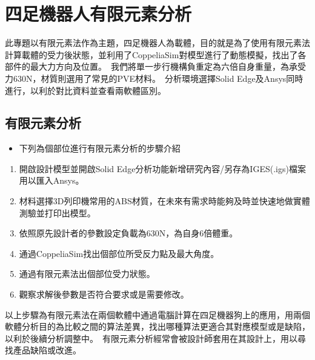 \chapter{四足機器人有限元素分析}

此專題以有限元素法作為主題，四足機器人為載體，目的就是為了使用有限元素法計算載體的受力後狀態，並利用了CoppeliaSim對模型進行了動態模擬，找出了各部件的最大力方向及位置。\
我們將單一步行機構負重定為六倍自身重量，為承受力630N，材質則選用了常見的PVE材料。\
分析環境選擇Solid Edge及Ansys同時進行，以利於對比資料並查看兩軟體區別。\\

\section{有限元素分析}
\begin{itemize}
\item 下列為個部位進行有限元素分析的步驟介紹
\end{itemize}
\begin{enumerate}
\item 開啟設計模型並開啟Solid Edge分析功能新增研究內容/另存為IGES(.igs)檔案用以匯入Ansys。
\item 材料選擇3D列印機常用的ABS材質，在未來有需求時能夠及時並快速地做實體測驗並打印出模型。
\item 依照原先設計者的參數設定負載為630N，為自身6倍體重。
\item 通過CoppeliaSim找出個部位所受反力點及最大角度。
\item 通過有限元素法出個部位受力狀態。
\item 觀察求解後參數是否符合要求或是需要修改。
\end{enumerate}
以上步驟為有限元素法在兩個軟體中通過電腦計算在四足機器狗上的應用，用兩個軟體分析目的為比較之間的算法差異，找出哪種算法更適合其對應模型或是缺陷，以利於後續分析調整中。\
有限元素分析經常會被設計師套用在其設計上，用以尋找產品缺陷或改進。\
\newpage
